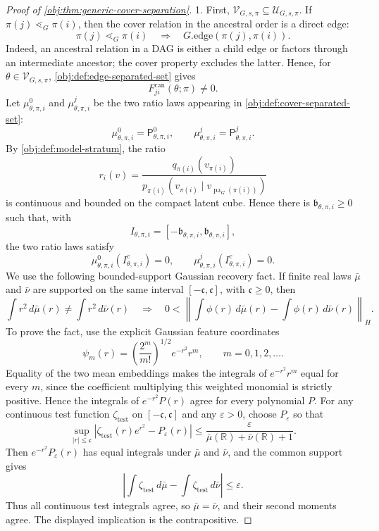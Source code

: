 \documentclass[11pt]{article}
\begin{document}
\begin{proof}[Proof of \cref{obj:thm:generic-cover-separation}]
1.  First, \(\mathcal V_{G,s,\pi}\subseteq \mathcal U_{G,s,\pi}\).  If
\(\pi(j)\lessdot_G\pi(i)\), then the cover relation in the ancestral order is a
direct edge:
\[
\pi(j)\lessdot_G\pi(i)\quad\Longrightarrow\quad G.\mathrm{edge}(\pi(j),\pi(i)).
\]
Indeed, an ancestral relation in a DAG is either a child edge or factors through
an intermediate ancestor; the cover property excludes the latter.  Hence, for
\(\theta\in\mathcal V_{G,s,\pi}\), \cref{obj:def:edge-separated-set} gives
\[
F^{\mathrm{can}}_{ji}(\theta;\pi)\ne 0.
\]
Let \(\mu^0_{\theta,\pi,i}\) and \(\mu^j_{\theta,\pi,i}\) be the two ratio laws
appearing in \cref{obj:def:cover-separated-set}:
\[
\mu^0_{\theta,\pi,i}=\mathsf P^0_{\theta,\pi,i},
\qquad
\mu^j_{\theta,\pi,i}=\mathsf P^j_{\theta,\pi,i}.
\]
By \cref{obj:def:model-stratum}, the ratio
\[
r_i(v)=
\frac{q_{\pi(i)}(v_{\pi(i)})}
     {p_{\pi(i)}(v_{\pi(i)}\mid v_{\operatorname{pa}_G(\pi(i))})}
\]
is continuous and bounded on the compact latent cube.  Hence there is
\(\mathfrak b_{\theta,\pi,i}\ge0\) such that, with
\[
I_{\theta,\pi,i}=[-\mathfrak b_{\theta,\pi,i},\mathfrak b_{\theta,\pi,i}],
\]
the two ratio laws satisfy
\[
\mu^0_{\theta,\pi,i}(I_{\theta,\pi,i}^{c})=0,
\qquad
\mu^j_{\theta,\pi,i}(I_{\theta,\pi,i}^{c})=0.
\]
We use the following bounded-support Gaussian recovery fact.  If finite real
laws \(\bar\mu\) and \(\bar\nu\) are supported on the same interval
\([-\mathfrak c,\mathfrak c]\), with \(\mathfrak c\ge0\), then
\[
\int r^2\,d\bar\mu(r)\ne \int r^2\,d\bar\nu(r)
\quad\Longrightarrow\quad
0<
\left\|
\int \phi(r)\,d\bar\mu(r)-\int \phi(r)\,d\bar\nu(r)
\right\|_H .
\]
To prove the fact, use the explicit Gaussian feature coordinates
\[
\psi_m(r)=\left(\frac{2^m}{m!}\right)^{1/2}e^{-r^2}r^m,
\qquad m=0,1,2,\ldots .
\]
Equality of the two mean embeddings makes the integrals of
\(e^{-r^2}r^m\) equal for every \(m\), since the coefficient multiplying this
weighted monomial is strictly positive.  Hence the integrals of
\(e^{-r^2}P(r)\) agree for every polynomial \(P\).  For any continuous test function
\(\zeta_{\mathrm{test}}\) on \([-\mathfrak c,\mathfrak c]\) and any
\(\varepsilon>0\), choose \(P_\varepsilon\) so that
\[
\sup_{|r|\le\mathfrak c}
\left|\zeta_{\mathrm{test}}(r)e^{r^2}-P_\varepsilon(r)\right|
\le
\frac{\varepsilon}{\bar\mu(\mathbb R)+\bar\nu(\mathbb R)+1}.
\]
Then \(e^{-r^2}P_\varepsilon(r)\) has equal integrals under \(\bar\mu\) and
\(\bar\nu\), and the common support gives
\[
\left|\int \zeta_{\mathrm{test}}\,d\bar\mu-
\int \zeta_{\mathrm{test}}\,d\bar\nu\right|
\le\varepsilon.
\]
Thus all continuous test integrals agree, so \(\bar\mu=\bar\nu\), and their
second moments agree.  The displayed implication is the contrapositive.


\end{proof}
\end{document}
